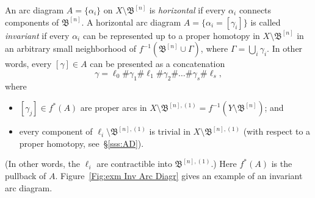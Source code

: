 \documentclass{amsart}
\newcommand{\bbush}{{\boldsymbol {\mathfrak B} }}
\newcommand{\1}{{\mathbb 1 }}
\begin{document}
An arc diagram $A=\{\alpha_i\}$ on $X\setminus \bbush^{[n]}$ is \emph{horizontal} if every $\alpha_i$ connects components of $\bbush^{[n]}$. A horizontal arc diagram $A=\{\alpha_i=[\gamma_i]\}$ is called \emph{invariant} if every $\alpha_i$ can be represented up to a proper homotopy in $X\setminus \bbush^{[n]}$ in an arbitrary small neighborhood of $f^{-1}\left(\bbush^{[n]}\cup \Gamma \right)$, where $\Gamma=\bigcup_i \gamma_i$. In other words, every $[\gamma]\in A$ can be presented as a concatenation 
\begin{equation}
\label{eq:form for gamma:base}
\gamma = \ell_0\#\gamma_1\# \ell_1 \#\gamma_2\# \dots \#\gamma_s\#\ell_s,
\end{equation}
where
\begin{itemize}
\item $[\gamma_j]\in f^*(A)$ are proper arcs in $X\setminus \bbush^{[n],(1)}=f^{-1}\left(Y\setminus \bbush^{[n]}\right)$; and
\item every component of $\ell_i\setminus \bbush^{[n],(1)}$ is trivial in $X\setminus \bbush^{[n],(1)}$ (with respect to a proper homotopy, see~\S\ref{sss:AD}).
\end{itemize} (In other words, the $\ell_i$ are contractible into $\bbush^{[n],(1)}$.) Here $f^*(A)$ is the pullback of $A$. Figure~\ref{Fig:exm Inv Arc Diagr} gives an example of an invariant arc diagram. 
 
\end{document}
